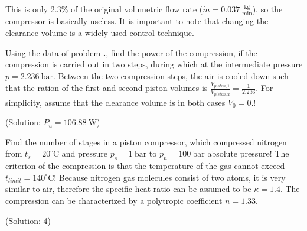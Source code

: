 This is only 2.3\% of the original volumetric flow rate ($\dot{m} = 0.037~\frac{\mathrm{kg}}{\mathrm{min}}$), so the compressor is basically useless. It is important to note that changing the clearance volume is a widely used control technique.

\vspace{1cm}

Using the data of problem {\bf \thesection.\theprob}, find the power of the compression, if the compression is carried out in two steps, during which at the intermediate pressure $p=2.236~\mathrm{bar}$. Between the two compression steps, the air is cooled down such that the ration of the first and second piston volumes is $\frac{V_{piston,1}}{V_{piston,2}} = \frac{1}{2.236}$. For simplicity, assume that the clearance volume is in both cases $V_0 = 0$.!

(Solution: $P_u = 106.88~\mathrm{W}$)

\vspace{1cm}

Find the number of stages in a piston compressor, which compressed nitrogen from $t_s = 20^\circ\mathrm{C}$ and pressure $p_s = 1~\mathrm{bar}$ to $p_n = 100~\mathrm{bar}$ absolute pressure! The criterion of the compression is that the temperature of the gas cannot exceed $t_{limit} = 140^\circ \mathrm{C}$! Because nitrogen gas molecules consist of two atoms, it is very similar to air, therefore the specific heat ratio can be assumed to be $\kappa = 1.4$. The compression can be characterized by a polytropic coefficient $n=1.33$.

(Solution: 4)

